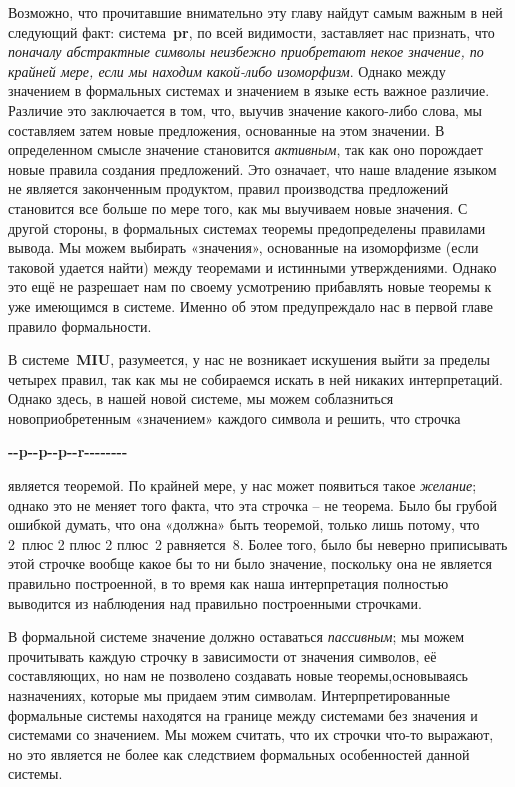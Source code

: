 \documentclass[../main.tex]{subfiles}
\begin{document}
Возможно, что прочитавшие внимательно эту главу найдут самым важным в ней следующий факт: система~\textbf{pr}, по всей видимости, заставляет нас признать, что \emph{поначалу абстрактные символы неизбежно приобретают некое значение, по крайней мере, если мы находим какой-либо изоморфизм}. Однако между значением в формальных системах и значением в языке есть важное различие. Различие это заключается в том, что, выучив значение какого-либо слова, мы составляем затем новые предложения, основанные на этом значении. В определенном смысле значение становится \emph{активным}, так как оно порождает новые правила создания предложений. Это означает, что наше владение языком не является законченным продуктом, правил производства предложений становится все больше по мере того, как мы выучиваем новые значения. С другой стороны, в формальных системах теоремы предопределены правилами вывода. Мы можем выбирать «значения», основанные на изоморфизме (если таковой удается найти) между теоремами и истинными утверждениями. Однако это ещё не разрешает нам по своему усмотрению прибавлять новые теоремы к уже имеющимся в системе. Именно об этом предупреждало нас в первой главе правило формальности.

В системе~\textbf{MIU}, разумеется, у нас не возникает искушения выйти за пределы четырех правил, так как мы не собираемся искать в ней никаких интерпретаций. Однако здесь, в нашей новой системе, мы можем соблазниться новоприобретенным «значением» каждого символа и решить, что строчка
\begin{center}
    \textbf{-{}-p-{}-p-{}-p-{}-r-{}-{}-{}-{}-{}-{}-{}-}
\end{center}
является теоремой. По крайней мере, у нас может появиться такое \emph{желание}; однако это не меняет того факта, что эта строчка \--- не теорема. Было бы грубой ошибкой думать, что она «должна» быть теоремой, только лишь потому, что 2~плюс 2 плюс 2 плюс~2 равняется~8. Более того, было бы неверно приписывать этой строчке вообще какое бы то ни было значение, поскольку она не является правильно построенной, в то время как наша интерпретация полностью выводится из наблюдения над правильно построенными строчками.

В формальной системе значение должно оставаться \emph{пассивным}; мы можем прочитывать каждую строчку в зависимости от значения символов, её составляющих, но нам не позволено создавать новые теоремы,основываясь назначениях, которые мы придаем этим символам. Интерпретированные формальные системы находятся на границе между системами без значения и системами со значением. Мы можем считать, что их строчки что-то выражают, но это является не более как следствием формальных особенностей данной системы.
\end{document}
